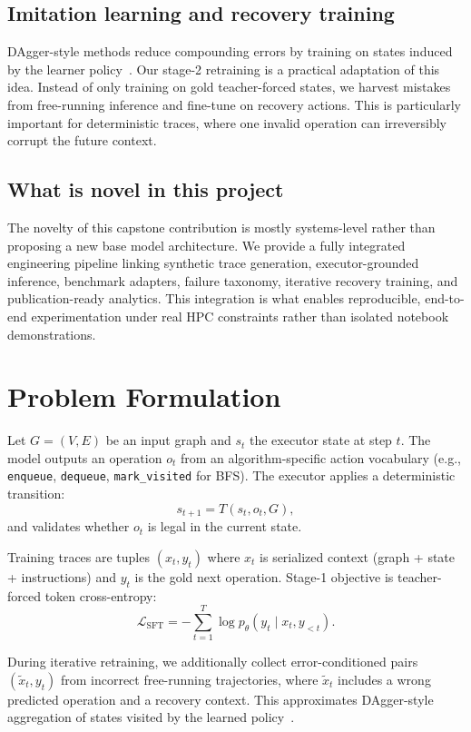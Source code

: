 \documentclass[sigplan,screen]{acmart}
\begin{document}
\subsection{Imitation learning and recovery training}
DAgger-style methods reduce compounding errors by training on states induced by the learner policy~\cite{ross2011dagger}.
Our stage-2 retraining is a practical adaptation of this idea.
Instead of only training on gold teacher-forced states, we harvest mistakes from free-running inference and fine-tune on recovery actions.
This is particularly important for deterministic traces, where one invalid operation can irreversibly corrupt the future context.

\subsection{What is novel in this project}
The novelty of this capstone contribution is mostly systems-level rather than proposing a new base model architecture.
We provide a fully integrated engineering pipeline linking synthetic trace generation, executor-grounded inference, benchmark adapters, failure taxonomy, iterative recovery training, and publication-ready analytics.
This integration is what enables reproducible, end-to-end experimentation under real HPC constraints rather than isolated notebook demonstrations.

\section{Problem Formulation}
Let $G=(V,E)$ be an input graph and $s_t$ the executor state at step $t$.
The model outputs an operation $o_t$ from an algorithm-specific action vocabulary (e.g., \texttt{enqueue}, \texttt{dequeue}, \texttt{mark\_visited} for BFS).
The executor applies a deterministic transition:
\begin{equation}
  s_{t+1} = T(s_t, o_t, G),
\end{equation}
and validates whether $o_t$ is legal in the current state.

Training traces are tuples $(x_t, y_t)$ where $x_t$ is serialized context (graph + state + instructions) and $y_t$ is the gold next operation.
Stage-1 objective is teacher-forced token cross-entropy:
\begin{equation}
\mathcal{L}_{\text{SFT}} = -\sum_{t=1}^{T}\log p_\theta(y_t\mid x_t, y_{<t}).
\end{equation}

During iterative retraining, we additionally collect error-conditioned pairs $(\tilde{x}_t, y_t)$ from incorrect free-running trajectories, where $\tilde{x}_t$ includes a wrong predicted operation and a recovery context.
This approximates DAgger-style aggregation of states visited by the learned policy~\cite{ross2011dagger}.
\end{document}
